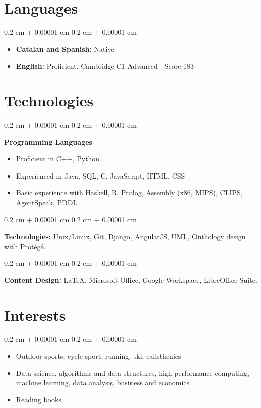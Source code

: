 \documentclass[10pt, letterpaper]{article}
\newenvironment{highlightsforbulletentries}{
    \begin{itemize}[
        topsep=0.10 cm,
        parsep=0.10 cm,
        partopsep=0pt,
        itemsep=0pt,
        leftmargin=10pt
    ]
}{
    \end{itemize}
} %
\newenvironment{onecolentry}{
    \begin{adjustwidth}{
        0.2 cm + 0.00001 cm
    }{
        0.2 cm + 0.00001 cm
    }
}{
    \end{adjustwidth}
} %
\begin{document}
    \section{Languages}
        \begin{onecolentry}
            \begin{highlightsforbulletentries}
                \item \textbf{Catalan and Spanish:} Native
                \item \textbf{English:} Proficient. Cambridge C1 Advanced - Score 183
            \end{highlightsforbulletentries}
        \end{onecolentry}

    
    \section{Technologies}
        \begin{onecolentry}
            \textbf{Programming Languages}
                \begin{highlightsforbulletentries}
                    \item Proficient in C++, Python
                    \item Experienced in Java, SQL, C, JavaScript, HTML, CSS
                    \item Basic experience with Haskell, R, Prolog, Assembly (x86, MIPS), CLIPS, AgentSpeak, PDDL
                \end{highlightsforbulletentries}
        \end{onecolentry}

        \vspace{0.2 cm}

        \begin{onecolentry}
            \textbf{Technologies:} Unix/Linux, Git, Django, AngularJS, UML, Onthology design
            with Protégé.
        \end{onecolentry}
        
        \vspace{0.2 cm}
        
        \begin{onecolentry}
            \textbf{Content Design:} LaTeX, Microsoft Office, Google Workspace, LibreOffice Suite.
        \end{onecolentry}


    \section{Interests}
        \begin{onecolentry}
            \begin{highlightsforbulletentries}
                \item Outdoor sports, cycle sport, running, ski, calisthenics
                \item Data science, algorithms and data structures, high-performance computing, machine learning, data analysis, business and economics
                \item Reading books
            \end{highlightsforbulletentries}
        \end{onecolentry}
    
\end{document}
